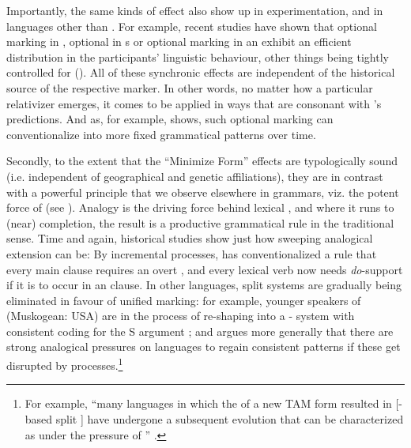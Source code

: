 \documentclass[output=paper]{langsci/langscibook}
\begin{document}
Importantly, the same kinds of effect also show up in  experimentation, and in languages other than . For example, recent studies have shown that optional  marking in , optional  in  s or optional  marking in an  exhibit an efficient distribution in the participants’ linguistic behaviour, other things being tightly controlled for (\citealt{KurumadaJaeger2015,NorcliffeJaeger2016,KurumadaGrimm2017}). All of these synchronic effects are independent of the historical source of the respective marker. In other words, no matter how a particular relativizer emerges, it comes to be applied in ways that are consonant with ’s  predictions. And as, for example,  shows, such optional marking can conventionalize into more fixed grammatical patterns over time.
\newpage

Secondly, to the extent that the “Minimize Form” effects are typologically sound (i.e. independent of geographical and genetic affiliations), they are in contrast with a powerful principle that we observe elsewhere in grammars, viz. the potent force of  (see \citealt{GentnerSmith2012,BlevinsBlevins2009}). Analogy is the driving force behind lexical , and where it runs to (near) completion, the result is a productive grammatical rule in the traditional sense. Time and again, historical studies show just how sweeping analogical extension can be: By incremental  processes,  has conventionalized a rule that every main clause requires an overt , and every lexical verb now needs \textit{do}{}-support if it is to occur in an  clause. In other languages, split  systems are gradually being eliminated in favour of unified marking: for example, younger speakers of  (Muskogean: USA) are in the process of re-shaping  into a - system with consistent coding for the S argument \citep[140]{Broadwell2006_Choct}; and \citet{Creissels2018_OblCod} argues more generally that there are strong analogical pressures on languages to regain consistent  patterns if these get disrupted by  processes.\footnote{For example, “many languages in which the  of a new TAM form resulted in [-based split  ] have undergone a subsequent evolution that can be characterized as  under the pressure of ” \citep[81]{Creissels2018_OblCod}.} 
\end{document}
